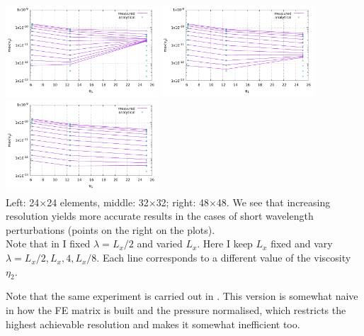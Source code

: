 \begin{center}
\includegraphics[width=5.7cm]{python_codes/fieldstone_40/RESULTS/plot24x24}
\includegraphics[width=5.7cm]{python_codes/fieldstone_40/RESULTS/plot32x32}
\includegraphics[width=5.7cm]{python_codes/fieldstone_40/RESULTS/plot48x48}\\
{\captionfont  Left: 24$\times$24 elements, middle: 32$\times$32; right: 48$\times$48. We see that 
increasing resolution yields more accurate results in the cases of short wavelength 
perturbations (points on the right on the plots).\\  
Note that in \cite{thie11} I fixed $\lambda=L_x/2$ and varied $L_x$. Here I keep $L_x$ fixed
and vary $\lambda=L_x/2,L_x,4,L_x/8$. Each line corresponds to a different value of the viscosity $\eta_2$.} 
\end{center}


\begin{remark}
Note that the same experiment is carried out in . 
This version is somewhat naive in how the FE matrix is built and the pressure normalised, 
which restricts the highest achievable resolution and makes it somewhat inefficient too.
\end{remark}
